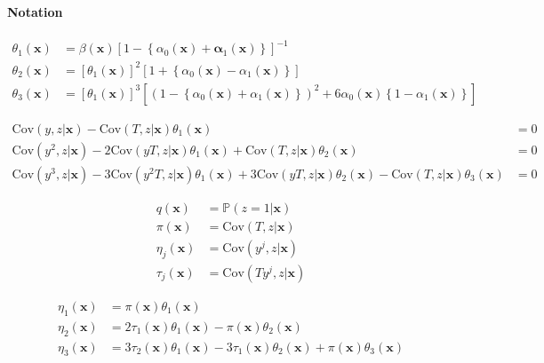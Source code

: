 \paragraph{Notation}

\begin{align}
  \label{eq:theta1_def}
  \theta_1(\mathbf{x}) &= \beta(\mathbf{x})\left[ 1 - \left\{ \alpha_0(\mathbf{x}) + \mathbf{\alpha}_1(\mathbf{x}) \right\} \right]^{-1}\\
  \label{eq:theta2_def}
  \theta_2(\mathbf{x}) &= \left[\theta_1(\mathbf{x})\right]^2 \left[ 1 + \left\{\alpha_0(\mathbf{x}) - \alpha_1(\mathbf{x})\right\}\right] \\
  \label{eq:theta3_def}
  \theta_3(\mathbf{x}) &= \left[\theta_1(\mathbf{x})\right]^3\left[ \left( 1 - \left\{\alpha_0(\mathbf{x}) + \alpha_1(\mathbf{x})\right\} \right)^2 + 6\alpha_0(\mathbf{x})\left\{ 1 - \alpha_1(\mathbf{x}) \right\} \right]
\end{align}

\begin{align*}
  \mbox{Cov}(y,z|\mathbf{x}) - \mbox{Cov}(T,z|\mathbf{x}) \theta_1(\mathbf{x}) &= 0\\
  \mbox{Cov}(y^2,z|\mathbf{x}) - 2\mbox{Cov}(yT,z|\mathbf{x}) \theta_1(\mathbf{x}) + \mbox{Cov}(T,z|\mathbf{x})\theta_2(\mathbf{x}) &= 0\\
  \mbox{Cov}(y^3,z|\mathbf{x}) - 3 \mbox{Cov}(y^2T,z|\mathbf{x}) \theta_1(\mathbf{x}) + 3\mbox{Cov}(yT,z|\mathbf{x}) \theta_2(\mathbf{x}) - \mbox{Cov}(T,z|\mathbf{x}) \theta_3(\mathbf{x})&= 0
\end{align*}

\begin{align*}
  q(\mathbf{x}) &= \mathbb{P}(z=1|\mathbf{x})\\
  \pi(\mathbf{x}) &= \mbox{Cov}(T,z|\mathbf{x})\\
  \eta_j(\mathbf{x}) &= \mbox{Cov}(y^j,z|\mathbf{x})\\
  \tau_j(\mathbf{x}) &= \mbox{Cov}(Ty^j,z|\mathbf{x})
\end{align*}

\begin{align*}
 \eta_1(\mathbf{x}) &= \pi(\mathbf{x})\theta_1(\mathbf{x}) \\
  \eta_2(\mathbf{x}) &=  2\tau_1(\mathbf{x}) \theta_1(\mathbf{x}) - \pi(\mathbf{x})\theta_2(\mathbf{x}) \\
  \eta_3(\mathbf{x}) &=  3\tau_2(\mathbf{x}) \theta_1(\mathbf{x}) - 3\tau_1(\mathbf{x}) \theta_2(\mathbf{x}) + \pi(\mathbf{x})\theta_3(\mathbf{x})
\end{align*}



